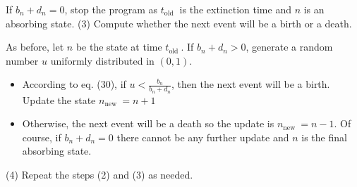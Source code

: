 If $b_{n}+d_{n}=0$, stop the program as $t_{\text {old }}$ is the extinction
time and $n$ is an absorbing state.
(3) Compute whether the next event will be a birth or a death.

As before, let $n$ be the state at time $t_{\text {old }}$. If $b_{n}+d_{n}>0$,
generate a random number $u$ uniformly distributed in $(0,1)$.
\begin{itemize}
  \item According to eq. (30), if $u<\frac{b_{n}}{b_{n}+d_{n}}$, then the next
    event will be a birth. Update the state $n_{\text {new }}=n+1$
  \item Otherwise, the next event will be a death so the update is
    $n_{\text {new }}=n-1$.
    Of course, if $b_{n}+d_{n}=0$ there cannot be any further update and $n$ is
    the final absorbing state.
\end{itemize}
(4) Repeat the steps (2) and (3) as needed.

